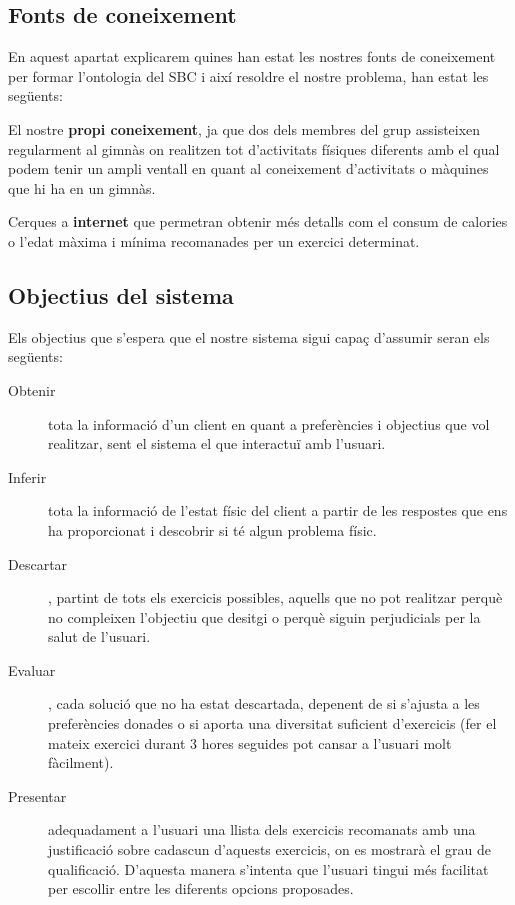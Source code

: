 \documentclass[a4paper, 12pt]{article}
\begin{document}
\subsection{Fonts de coneixement}

En aquest apartat explicarem quines han estat les nostres fonts de coneixement per formar l'ontologia del SBC i així resoldre el nostre problema, han estat les següents:

El nostre \textbf{propi coneixement}, ja que dos dels membres del grup assisteixen regularment al gimnàs on realitzen tot d'activitats físiques diferents amb el qual podem tenir un ampli ventall en quant al coneixement d'activitats o màquines que hi ha en un gimnàs.

Cerques a \textbf{internet} que permetran obtenir més detalls com el consum de calories o l'edat màxima i mínima recomanades per un exercici determinat.

\subsection{Objectius del sistema}

Els objectius que s'espera que el nostre sistema sigui capaç d'assumir seran els següents:

\begin{description}
	\item[Obtenir] tota la informació d'un client en quant a preferències i objectius que vol realitzar, sent el sistema el que interactuï amb l'usuari.
	\item[Inferir] tota la informació de l'estat físic del client a partir de les respostes que ens ha proporcionat i descobrir si té algun problema físic.
	\item[Descartar], partint de tots els exercicis possibles, aquells que no pot realitzar perquè no compleixen l'objectiu que desitgi o perquè siguin perjudicials per la salut de l'usuari.
	\item[Evaluar], cada solució que no ha estat descartada, depenent de si s'ajusta a les preferències donades o si aporta una diversitat suficient d'exercicis (fer el mateix exercici durant 3 hores seguides pot cansar a l'usuari molt fàcilment).
	\item[Presentar] adequadament a l'usuari una llista dels exercicis recomanats amb una justificació sobre cadascun d'aquests exercicis, on es mostrarà el grau de qualificació. D'aquesta manera s'intenta que l'usuari tingui més facilitat per escollir entre les diferents opcions proposades.
\end{description}
\end{document}
